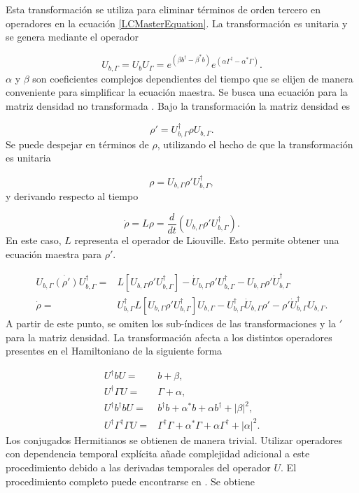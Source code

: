 \documentclass[10pt,a4paper]{report}
\begin{document}
Esta transformación se utiliza para eliminar términos de orden tercero en operadores en la ecuación \eqref{LCMasterEquation}. La transformación es unitaria y se genera mediante el operador

\begin{equation}
U_{b,\Gamma} =  U_b U_\Gamma = e^{(\beta b^\dagger - \beta^* b)}e^{(\alpha\Gamma^\dagger - \alpha^* \Gamma)}.
\end{equation} $\alpha$ y $\beta$ son coeficientes complejos dependientes del tiempo que se elijen de manera conveniente para simplificar la ecuación maestra. Se busca una ecuación para la matriz densidad no transformada \cite{TesisMaestria}. Bajo la transformación la matriz densidad es

\begin{equation}
\rho' = U_{b,\Gamma}^\dagger \rho U_{b,\Gamma}.
\end{equation} Se puede despejar en términos de $\rho$, utilizando el hecho de que la transformación es unitaria

\begin{equation}
\rho = U_{b,\Gamma} \rho' U_{b,\Gamma}^\dagger,
\end{equation}y derivando respecto al tiempo

\begin{equation}
\dot{\rho} = L\rho = \frac{d}{dt}(U_{b,\Gamma} \rho' U_{b,\Gamma}^\dagger).
\end{equation} En este caso, $L$ representa el operador de Liouville. Esto permite obtener una ecuación maestra para $\rho'$. 

\begin{align}
 U_{b,\Gamma} \dot{(\rho')} U_{b,\Gamma}^\dagger =& L[U_{b,\Gamma} \rho' U_{b,\Gamma}^\dagger] - \dot{U}_{b,\Gamma}\rho'U_{b,\Gamma}^\dagger -U_{b,\Gamma} \rho' \dot{U}_{b,\Gamma}^\dagger\\
\dot{\rho} =& U_{b,\Gamma}^\dagger L[U_{b,\Gamma} \rho' U_{b,\Gamma}^\dagger]U_{b,\Gamma}-U_{b,\Gamma}^\dagger\dot{U}_{b,\Gamma}\rho'-\rho'\dot{U}_{b,\Gamma}^\dagger U_{b,\Gamma}.
\end{align} A partir de este punto, se omiten los sub-índices de las transformaciones y la $'$ para la matriz densidad. La transformación afecta a los distintos operadores presentes en el Hamiltoniano de la siguiente forma

\begin{align}
U^\dagger b U =& b + \beta,\\
U^\dagger \Gamma U =& \Gamma + \alpha,\\
U^\dagger b^\dagger b U =& b^\dagger b + \alpha^* b + \alpha b^\dagger +|\beta|^2,\\
U^\dagger \Gamma^\dagger \Gamma U =& \Gamma^\dagger \Gamma + \alpha^* \Gamma + \alpha \Gamma^\dagger +|\alpha|^2.
\end{align} Los conjugados Hermitianos se obtienen de manera trivial. Utilizar operadores con dependencia temporal explícita añade complejidad adicional a este procedimiento debido a las derivadas temporales del operador $U$. El procedimiento completo puede encontrarse en \cite{TesisMaestria}. Se obtiene
\end{document}
